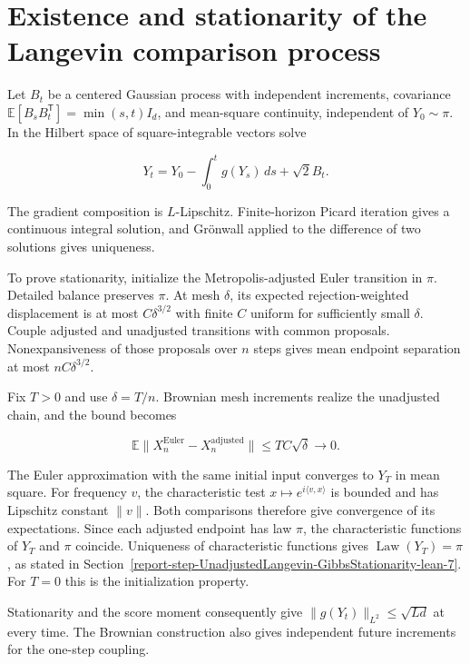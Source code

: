 \documentclass[11pt,a4paper]{report}
\begin{document}
\section{\texorpdfstring{Existence and stationarity of the Langevin comparison process}{Existence and stationarity of the Langevin comparison process}}



Let \(B_t\) be a centered Gaussian process with independent increments, covariance \(\mathbb E[B_sB_t^{\mathsf T}]=\min(s,t)I_d\), and mean-square continuity, independent of \(Y_0\sim\pi\). In the Hilbert space of square-integrable vectors solve

\[Y_t=Y_0-\int_0^t g(Y_s)\,ds+\sqrt2 B_t.\]

The gradient composition is \(L\)-Lipschitz. Finite-horizon Picard iteration gives a continuous integral solution, and Grönwall applied to the difference of two solutions gives uniqueness.



To prove stationarity, initialize the Metropolis-adjusted Euler transition in \(\pi\). Detailed balance preserves \(\pi\). At mesh \(\delta\), its expected rejection-weighted displacement is at most \(C\delta^{3/2}\) with finite \(C\) uniform for sufficiently small \(\delta\). Couple adjusted and unadjusted transitions with common proposals. Nonexpansiveness of those proposals over \(n\) steps gives mean endpoint separation at most \(nC\delta^{3/2}\).



Fix \(T>0\) and use \(\delta=T/n\). Brownian mesh increments realize the unadjusted chain, and the bound becomes

\[\mathbb E\|X_n^{\mathrm{Euler}}-X_n^{\mathrm{adjusted}}\|
\le TC\sqrt\delta\longrightarrow0.\]

The Euler approximation with the same initial input converges to \(Y_T\) in mean square. For frequency \(v\), the characteristic test \(x\mapsto e^{i\langle v,x\rangle}\) is bounded and has Lipschitz constant \(\|v\|\). Both comparisons therefore give convergence of its expectations. Since each adjusted endpoint has law \(\pi\), the characteristic functions of \(Y_T\) and \(\pi\) coincide. Uniqueness of characteristic functions gives \(\operatorname{Law}(Y_T)=\pi\), as stated in Section~\ref{report-step-UnadjustedLangevin-GibbsStationarity-lean-7}. For \(T=0\) this is the initialization property.



Stationarity and the score moment consequently give \(\|g(Y_t)\|_{L^2}\le\sqrt{Ld}\) at every time. The Brownian construction also gives independent future increments for the one-step coupling.
\end{document}
